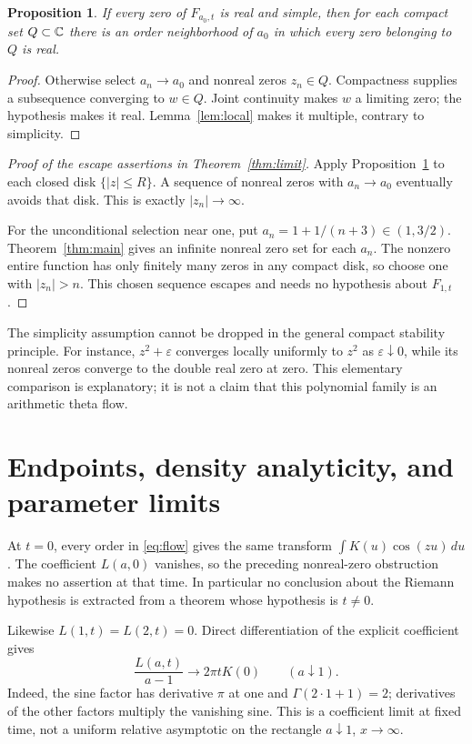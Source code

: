 \documentclass[11pt]{article}
\newtheorem{proposition}[theorem]{Proposition}
\theoremstyle{remark}\newtheorem{remark}[theorem]{Remark}
\begin{document}
\begin{proposition}\label{prop:compact}
If every zero of $F_{a_0,t}$ is real and simple, then for each
compact set $Q\subset\mathbb C$ there is an order neighborhood of $a_0$
in which every zero belonging to $Q$ is real.
\end{proposition}
\begin{proof}
Otherwise select $a_n\to a_0$ and nonreal zeros $z_n\in Q$.
Compactness supplies a subsequence converging to $w\in Q$.
Joint continuity makes $w$ a limiting zero; the hypothesis makes
it real. Lemma~\ref{lem:local} makes it multiple, contrary to simplicity.
\end{proof}

\begin{proof}[Proof of the escape assertions in Theorem~\ref{thm:limit}]
Apply Proposition~\ref{prop:compact} to each closed disk
$\{|z|\leq R\}$. A sequence of nonreal zeros with $a_n\to a_0$
eventually avoids that disk. This is exactly $|z_n|\to\infty$.

For the unconditional selection near one, put
$a_n=1+1/(n+3)\in(1,3/2)$. Theorem~\ref{thm:main} gives an infinite
nonreal zero set for each $a_n$. The nonzero entire function has
only finitely many zeros in any compact disk, so choose one with
$|z_n|>n$. This chosen sequence escapes and needs no hypothesis
about $F_{1,t}$.
\end{proof}

The simplicity assumption cannot be dropped in the general compact
stability principle. For instance, $z^2+\varepsilon$ converges
locally uniformly to $z^2$ as $\varepsilon\downarrow0$, while its
nonreal zeros converge to the double real zero at zero. This
elementary comparison is explanatory; it is not a claim that this
polynomial family is an arithmetic theta flow.

\section{Endpoints, density analyticity, and parameter limits}
At $t=0$, every order in \eqref{eq:flow} gives the same transform
$\int K(u)\cos(zu)\,du$. The coefficient $L(a,0)$ vanishes,
so the preceding nonreal-zero obstruction makes no assertion at
that time. In particular no conclusion about the Riemann hypothesis
is extracted from a theorem whose hypothesis is $t\neq0$.

Likewise $L(1,t)=L(2,t)=0$. Direct differentiation of the explicit
coefficient gives
\begin{equation}\label{eq:coefficientlimit}
 \frac{L(a,t)}{a-1}\longrightarrow2\pi tK(0)
 \qquad(a\downarrow1).
\end{equation}
Indeed, the sine factor has derivative $\pi$ at one and
$\Gamma(2\cdot1+1)=2$; derivatives of the other factors multiply
the vanishing sine. This is a coefficient limit at fixed time,
not a uniform relative asymptotic on the rectangle
$a\downarrow1$, $x\to\infty$.
\end{document}
